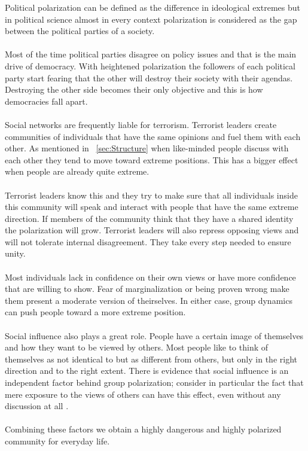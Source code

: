 Political polarization can be defined as the difference in ideological extremes but in political science almost in every context polarization is considered as the gap between the political parties of a society.
\\
\\
Most of the time political parties disagree on policy issues and that is the main drive of democracy. With heightened polarization the followers of each political party start fearing that the other will destroy their society with their agendas. Destroying the other side becomes their only objective and this is how democracies fall apart.
\\
\\
Social networks are frequently liable for terrorism. Terrorist leaders create communities of individuals that have the same opinions and fuel them with each other. As mentioned in ~\ref{sec:Structure}  when like-minded people discuss with each other they tend to move toward extreme positions. This has a bigger effect when people are already quite extreme. 
\\
\\
Terrorist leaders know this and they try to make sure that all individuals inside this community will speak and interact with people that have the same extreme direction. If members of the community think that they have a shared identity the polarization will grow. Terrorist leaders will also repress opposing views and will not tolerate internal disagreement. They take every step needed to ensure unity.
\\
\\
Most individuals lack in confidence on their own views or have more confidence that are willing to show. Fear of marginalization or being proven wrong make them present a moderate version of theirselves. In either case, group dynamics can push people toward a more extreme position.
\\
\\
Social influence also plays a great role. People have a certain image of themselves and how they want to be viewed by others. Most people like to think of themselves as not identical to but as different from others, but only in the right direction and to the right extent. There is evidence that social influence is an independent factor behind group polarization; consider in particular the fact that mere exposure to the views of others can have this effect, even without any discussion at all \cite{sunstein}.
\\
\\
Combining these factors we obtain a highly dangerous and highly polarized community for everyday life.


